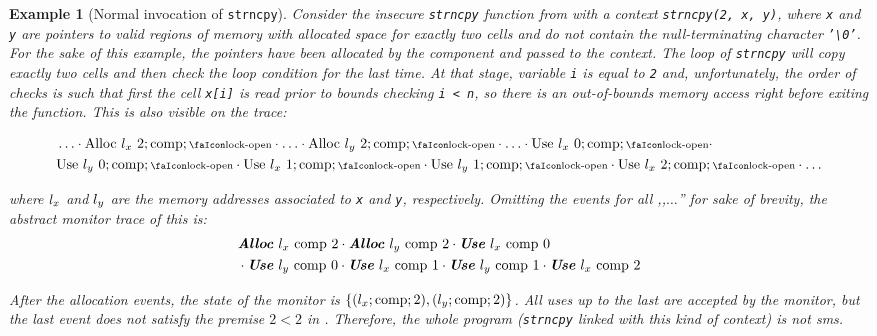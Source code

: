 \documentclass[dvipsnames]{llncs}
\newtheorem{exampleenv}{Example}[section]
\begin{document}
\begin{exampleenv}[Normal invocation of \texttt{strncpy}]\label{ex:strncpy:sms}
  Consider the insecure \texttt{strncpy} function from  with a context \texttt{strncpy(2, x, y)}, where \texttt{x} and \texttt{y} are pointers to valid regions of memory with allocated space for exactly two cells and do not contain the null-terminating character \texttt{'\textbackslash 0'}.
  For the sake of this example, the pointers have been allocated by the component and passed to the context.
  The loop of \texttt{strncpy} will copy exactly two cells and then check the loop condition for the last time.
  At that stage, variable \texttt{i} is equal to \texttt{2} and, unfortunately, the order of checks is such that first the cell \texttt{x[i]} is read prior to bounds checking \texttt{i < n}, so there is an out-of-bounds memory access right before exiting the function.
  This is also visible on the trace:
  	
  	{\small
  	\begin{align*}
  	&
  		\ldots
  		\cdot
  		\ev{Alloc}\ \loc_{x}\ 2;\comp;\unlock
  		\cdot
  		\ldots
  		\cdot
  		\ev{Alloc}\ \loc_{y}\ 2;\comp;\unlock
  		\cdot
  		\ldots
  		\cdot
  		\ev{Use}\ \loc_{x}\ 0;\comp;\unlock
  		\cdot
  		\\
  	&
  		\ev{Use}\ \loc_{y}\ 0;\comp;\unlock
  		\cdot
  		\ev{Use}\ \loc_{x}\ 1;\comp;\unlock
  		\cdot
  		\ev{Use}\ \loc_{y}\ 1;\comp;\unlock
  		\cdot
  		\ev{Use}\ \loc_{x}\ 2;\comp;\unlock
  		\cdot
  		\ldots	
  	\end{align*}
  	}

\noindent
where $l_{x}$ and $l_{y}$ are the memory addresses associated to \texttt{x} and \texttt{y}, respectively.
  Omitting the events for all ,,$\ldots$'' for sake of brevity, the abstract monitor trace of this is:
  	{\small
  	\begin{align*}
  		&
  		\bm{\mathit{Alloc}}\ l_{x}\ \text{comp}\ 2
  		\cdot
  		\bm{\mathit{Alloc}}\ l_{y}\ \text{comp}\ 2
  		\cdot
  		\bm{\mathit{Use}}\ l_{x}\ \text{comp}\ 0
  		\\
  		&
  		\cdot
  		\bm{\mathit{Use}}\ l_{y}\ \text{comp}\ 0
  		\cdot
  		\bm{\mathit{Use}}\ l_{x}\ \text{comp}\ 1
  		\cdot
  		\bm{\mathit{Use}}\ l_{y}\ \text{comp}\ 1
  		\cdot
  		\bm{\mathit{Use}}\ l_{x}\ \text{comp}\ 2
  	\end{align*}
  	}

  After the allocation events, the state of the monitor is $\left\{(l_{x};\text{comp};2),(l_{y};\text{comp};2)\right\}$.
  All uses up to the last are accepted by the monitor, but the last event does not satisfy the premise $2<2$ in .
  Therefore, the whole program (\texttt{strncpy} linked with this kind of context) is not \gls*{sms}.
\end{exampleenv}
\end{document}
